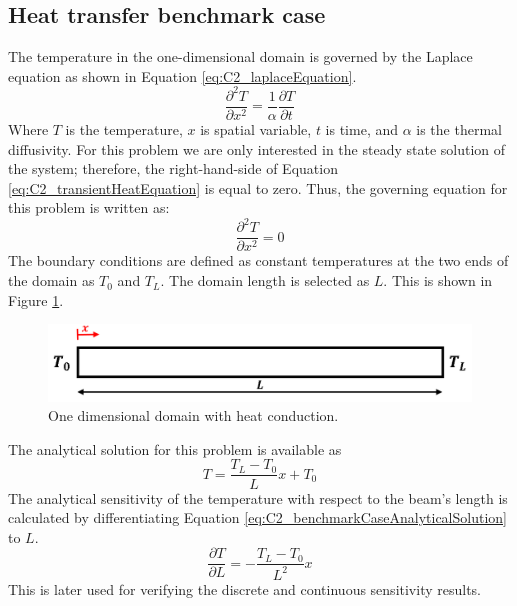 \subsection{Heat transfer benchmark case}
The temperature in the one-dimensional domain is governed by the Laplace equation as shown in Equation \eqref{eq:C2_laplaceEquation}.
%
\begin{equation}\label{eq:C2_transientHeatEquation}
    \frac{\partial^2 T}{\partial x^2} = \frac{1}{\alpha} \frac{\partial T}{\partial t}
\end{equation}
%
Where $T$ is the temperature, $x$ is spatial variable, $t$ is time, and $\alpha$ is the thermal diffusivity. For this problem we are only interested in the steady state solution of the system; therefore, the right-hand-side of Equation \eqref{eq:C2_transientHeatEquation} is equal to zero. Thus, the governing equation for this problem is written as:
%
\begin{equation}\label{eq:C2_laplaceEquation}
    \frac{\partial^2 T}{\partial x^2} = 0
\end{equation}
%
The boundary conditions are defined as constant temperatures at the two ends of the domain as $T_0$ and $T_L$. The domain length is selected as $L$. This is shown in Figure \ref{fig:C2_benchmarkCase}.
%
\begin{figure}[h]
    \centering
    \includegraphics[width=14.00cm]{Chapter_2/figure/benchmark_case.png}
    \caption{One dimensional domain with heat conduction.}
    \label{fig:C2_benchmarkCase}
\end{figure}
%
The analytical solution for this problem is available as
%
\begin{equation}\label{eq:C2_benchmarkCaseAnalyticalSolution}
    T = \frac{T_L - T_0}{L} x + T_0
\end{equation}
%
The analytical sensitivity of the temperature with respect to the beam's length is calculated by differentiating Equation \eqref{eq:C2_benchmarkCaseAnalyticalSolution} to $L$.
%
\begin{equation}
    \frac{\partial T}{\partial L} = -\frac{T_L - T_0}{L^2} x
\end{equation}
%
This is later used for verifying the discrete and continuous sensitivity results.
